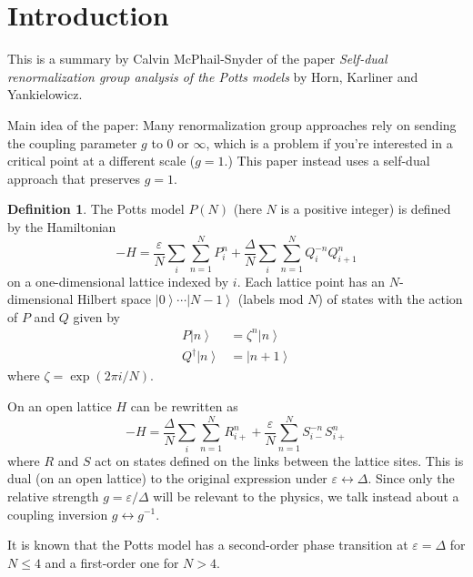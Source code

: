 \documentclass[10pt]{article}
\theoremstyle{definition}
\newtheorem{definition}{Definition}
\newcommand{\ket}[1]{\left | #1 \right \rangle}
\begin{document}
\section{Introduction}
This is a summary by Calvin McPhail-Snyder of the paper \emph{Self-dual renormalization group analysis of the Potts models} by Horn, Karliner and Yankielowicz.

Main idea of the paper: Many renormalization group approaches rely on sending the coupling parameter $g$ to $0$ or $\infty$, which is a problem if you're interested in a critical point at a different scale ($g = 1$.)
This paper instead uses a self-dual approach that preserves $g = 1$.

\begin{definition}
The Potts model $P(N)$ (here $N$ is a positive integer) is defined by the Hamiltonian
\[
-H = \frac{\varepsilon}{N} \sum_i \sum_{n=1}^N P_i^n + \frac{\Delta}{N} \sum_i \sum_{n=1}^N Q_i^{-n} Q_{i+1}^n
\]
on a one-dimensional lattice indexed by $i$.
Each lattice point has an $N$-dimensional Hilbert space $\ket{0} \cdots \ket{N-1}$ (labels mod $N$) of states with the action of $P$ and $Q$ given by
\begin{align*}
P \ket n &= \zeta^n \ket n\\
Q^\dagger \ket n &= \ket{n+1}
\end{align*}
where $\zeta = \exp(2 \pi i /N)$.
\end{definition}


On an open lattice $H$ can be rewritten as
\[
-H = \frac{\Delta}{N} \sum_i \sum_{n=1}^N R_{i+}^n + \frac{\varepsilon}{N} \sum_{n=1}^N S_{i-}^{-n} S_{i+}^n 
\]
where $R$ and $S$ act on states defined on the links between the lattice sites.
This is dual (on an open lattice) to the original expression under $\varepsilon \leftrightarrow \Delta$.
Since only the relative strength $g = \varepsilon / \Delta$ will be relevant to the physics, we talk instead about a coupling inversion $g \leftrightarrow g^{-1}$.

It is known that the Potts model has a second-order phase transition at $\varepsilon = \Delta$ for $N \le 4$ and a first-order one for $N > 4$.
\end{document}
